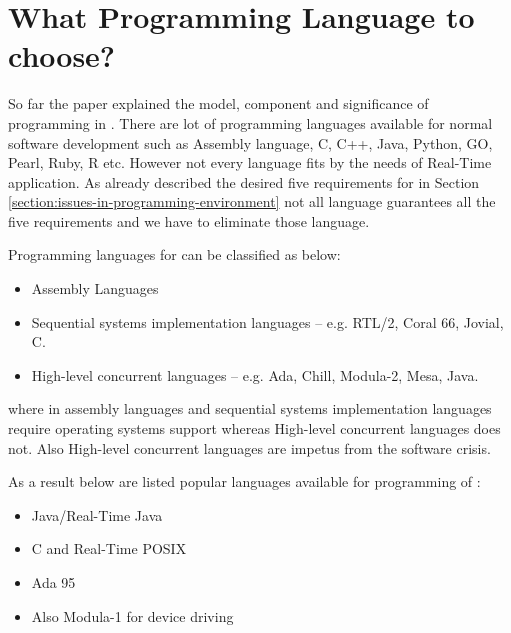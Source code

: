 \section{What Programming Language to choose?}\label{section:chosse-language}
So far the paper explained the \rtsS model, component and significance of programming in \rts.
There are lot of programming languages available for normal software development such as Assembly language, C, C++, Java, Python, GO, Pearl, Ruby, R etc. However not every language fits by the needs of Real-Time application. As already described the desired five requirements for \rtsS in Section \ref{section:issues-in-programming-environment} not all language guarantees all the five requirements and we have to eliminate those language.

Programming languages for \rtsS can be classified as below:
\begin{itemize}
    \item Assembly Languages
    \item Sequential systems implementation languages -- e.g. RTL/2, Coral 66, Jovial, C.
    \item High-level concurrent languages -- e.g. Ada, Chill, Modula-2, Mesa, Java.
\end{itemize}
where in assembly languages and sequential systems implementation languages require operating systems support whereas High-level concurrent languages does not. Also High-level concurrent languages are impetus from the software crisis.

As a result below are listed popular languages available for programming of \rts:
\begin{itemize}
    \item Java/Real-Time Java 
    \item C and Real-Time POSIX
    \item Ada 95
    \item Also Modula-1 for device driving
\end{itemize} 